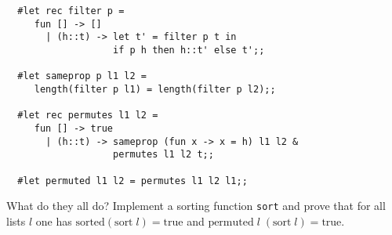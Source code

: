 \begin{enumerate}
\begin{boxed}
\begin{verbatim}
  #let rec filter p =
     fun [] -> []
       | (h::t) -> let t' = filter p t in
                   if p h then h::t' else t';;

  #let sameprop p l1 l2 =
     length(filter p l1) = length(filter p l2);;

  #let rec permutes l1 l2 =
     fun [] -> true
       | (h::t) -> sameprop (fun x -> x = h) l1 l2 &
                   permutes l1 l2 t;;

  #let permuted l1 l2 = permutes l1 l2 l1;;
\end{verbatim}\end{boxed}

\noindent What do they all do? Implement a sorting function {\tt sort} and
prove that for all lists $l$ one has $\mbox{sorted}(\mbox{sort}\; l) =
\mbox{true}$ and $\mbox{permuted}\; l\; (\mbox{sort}\; l) = \mbox{true}$.

\end{enumerate}


